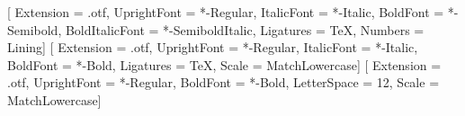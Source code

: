 \makeatletter

\geometry{
  paperwidth  = 170mm,
  paperheight = 240mm,
  inner       = 20mm,
  outer       = 22mm,
  top         = 24mm,
  bottom      = 26mm,
  headsep     = 7mm,
  footskip    = 11mm,
}
\setlength{\parindent}{1.2em}
\linespread{1.06}
\frenchspacing
\setlength{\emergencystretch}{1.5em}
\raggedbottom   %

\setmainfont{LibertinusSerif}[
  Extension      = .otf,
  UprightFont    = *-Regular,
  ItalicFont     = *-Italic,
  BoldFont       = *-Semibold,
  BoldItalicFont = *-SemiboldItalic,
  Ligatures      = TeX,
  Numbers        = Lining]
\setsansfont{LibertinusSans}[
  Extension      = .otf,
  UprightFont    = *-Regular,
  ItalicFont     = *-Italic,
  BoldFont       = *-Bold,
  Ligatures      = TeX,
  Scale          = MatchLowercase]
\newfontfamily{}[
  Extension = .otf, UprightFont = *-Regular, BoldFont = *-Bold,
  LetterSpace = 12, Scale = MatchLowercase]



